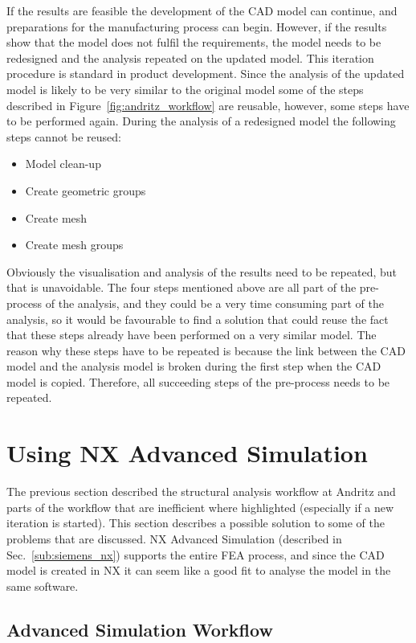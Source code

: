 If the results are feasible the development of the CAD model can continue, and preparations for the manufacturing process can begin. However, if the results show that the model does not fulfil the requirements, the model needs to be redesigned and the analysis repeated on the updated model. This iteration procedure is standard in product development. Since the analysis of the updated model is likely to be very similar to the original model some of the steps described in Figure~\ref{fig:andritz_workflow} are reusable, however, some steps have to be performed again. During the analysis of a redesigned model the following steps cannot be reused:
\begin{itemize}
	\item Model clean-up
	\item Create geometric groups
	\item Create mesh
	\item Create mesh groups
\end{itemize}
Obviously the visualisation and analysis of the results need to be repeated, but that is unavoidable. The four steps mentioned above are all part of the pre-process of the analysis, and they could be a very time consuming part of the analysis, so it would be favourable to find a solution that could reuse the fact that these steps already have been performed on a very similar model. The reason why these steps have to be repeated is because the link between the CAD model and the analysis model is broken during the first step when the CAD model is copied. Therefore, all succeeding steps of the pre-process needs to be repeated.

\section{Using NX Advanced Simulation} %
\label{sec:using_nx_advanced_simulation}
The previous section described the structural analysis workflow at Andritz and parts of the workflow that are inefficient where highlighted (especially if a new iteration is started). This section describes a possible solution to some of the problems that are discussed. NX Advanced Simulation (described in Sec.~\ref{sub:siemens_nx}) supports the entire FEA process, and since the CAD model is created in NX it can seem like a good fit to analyse the model in the same software.

\subsection{Advanced Simulation Workflow} %
\label{sub:advanced_simulation_workflow}

